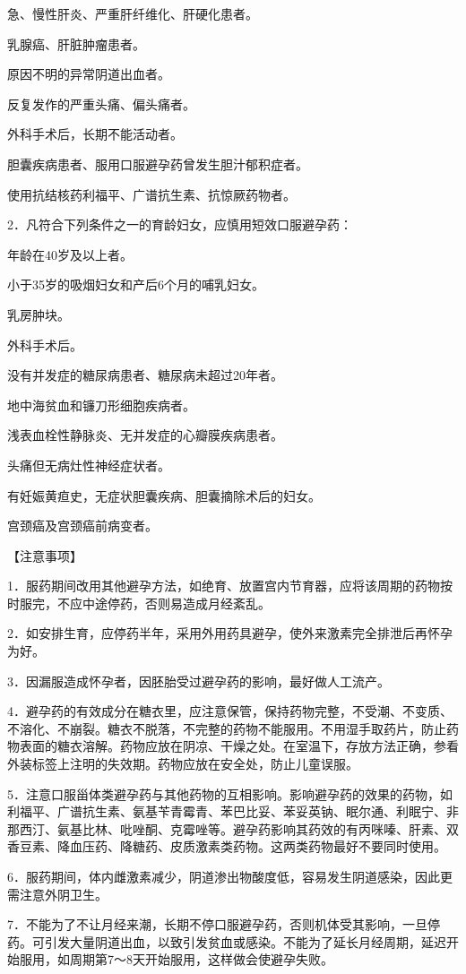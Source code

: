 \documentclass[12pt,UTF8]{ctexbook}
\begin{document}
急、慢性肝炎、严重肝纤维化、肝硬化患者。

乳腺癌、肝脏肿瘤患者。

原因不明的异常阴道出血者。

反复发作的严重头痛、偏头痛者。

外科手术后，长期不能活动者。

胆囊疾病患者、服用口服避孕药曾发生胆汁郁积症者。

使用抗结核药利福平、广谱抗生素、抗惊厥药物者。

2．凡符合下列条件之一的育龄妇女，应慎用短效口服避孕药：

年龄在40岁及以上者。

小于35岁的吸烟妇女和产后6个月的哺乳妇女。

乳房肿块。

外科手术后。

没有并发症的糖尿病患者、糖尿病未超过20年者。

地中海贫血和镰刀形细胞疾病者。

浅表血栓性静脉炎、无并发症的心瓣膜疾病患者。

头痛但无病灶性神经症状者。

有妊娠黄疸史，无症状胆囊疾病、胆囊摘除术后的妇女。

宫颈癌及宫颈癌前病变者。

【注意事项】

1．服药期间改用其他避孕方法，如绝育、放置宫内节育器，应将该周期的药物按时服完，不应中途停药，否则易造成月经紊乱。

2．如安排生育，应停药半年，采用外用药具避孕，使外来激素完全排泄后再怀孕为好。

3．因漏服造成怀孕者，因胚胎受过避孕药的影响，最好做人工流产。

4．避孕药的有效成分在糖衣里，应注意保管，保持药物完整，不受潮、不变质、不溶化、不崩裂。糖衣不脱落，不完整的药物不能服用。不用湿手取药片，防止药物表面的糖衣溶解。药物应放在阴凉、干燥之处。在室温下，存放方法正确，参看外装标签上注明的失效期。药物应放在安全处，防止儿童误服。

5．注意口服甾体类避孕药与其他药物的互相影响。影响避孕药的效果的药物，如利福平、广谱抗生素、氨基苄青霉青、苯巴比妥、苯妥英钠、眠尔通、利眠宁、非那西汀、氨基比林、吡唑酮、克霉唑等。避孕药影响其药效的有丙咪嗪、肝素、双香豆素、降血压药、降糖药、皮质激素类药物。这两类药物最好不要同时使用。

6．服药期间，体内雌激素减少，阴道渗出物酸度低，容易发生阴道感染，因此更需注意外阴卫生。

7．不能为了不让月经来潮，长期不停口服避孕药，否则机体受其影响，一旦停药。可引发大量阴道出血，以致引发贫血或感染。不能为了延长月经周期，延迟开始服用，如周期第7～8天开始服用，这样做会使避孕失败。
\end{document}
